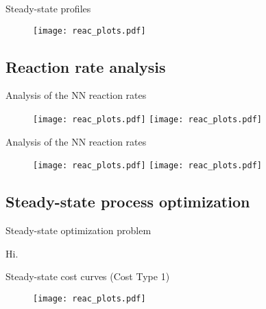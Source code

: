 \documentclass[xcolor=dvipsnames, 8pt]{beamer} %
\begin{document}
\begin{frame}{Steady-state profiles}
	
	\begin{figure}
		\centering
		\texttt{[image: reac\_plots.pdf]}
	\end{figure}
	
\end{frame}

\subsection{Reaction rate analysis}
\begin{frame}{Analysis of the NN reaction rates}

	\begin{figure}
		\centering
		\texttt{[image: reac\_plots.pdf]}
		\texttt{[image: reac\_plots.pdf]}
	\end{figure}

\end{frame}

\begin{frame}{Analysis of the NN reaction rates}
	
	\begin{figure}
		\centering
		\texttt{[image: reac\_plots.pdf]}
		\texttt{[image: reac\_plots.pdf]}
	\end{figure}
	
\end{frame}

\subsection{Steady-state process optimization}
\begin{frame}{Steady-state optimization problem}

	Hi.

\end{frame}

\begin{frame}{Steady-state cost curves (Cost Type 1)}

\begin{figure}
	\centering
	\texttt{[image: reac\_plots.pdf]}
\end{figure}

\end{frame}
\end{document}
